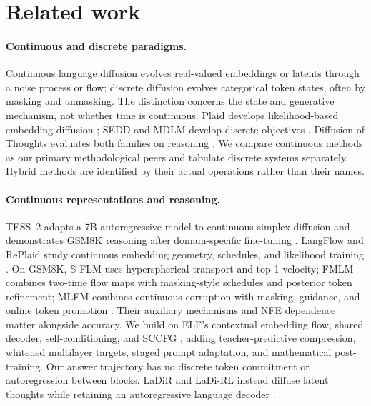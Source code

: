 \section{Related work}
\paragraph{Continuous and discrete paradigms.}
Continuous language diffusion evolves real-valued embeddings or latents through a noise process or flow; discrete diffusion evolves categorical token states, often by masking and unmasking. The distinction concerns the state and generative mechanism, not whether time is continuous. Plaid develops likelihood-based embedding diffusion \citep{plaid}; SEDD and MDLM develop discrete objectives \citep{sedd,mdlm}. Diffusion of Thoughts evaluates both families on reasoning \citep{dot}. We compare continuous methods as our primary methodological peers and tabulate discrete systems separately. Hybrid methods are identified by their actual operations rather than their names.

\paragraph{Continuous representations and reasoning.}
TESS~2 adapts a 7B autoregressive model to continuous simplex diffusion and demonstrates GSM8K reasoning after domain-specific fine-tuning \citep{tess2}. LangFlow and RePlaid study continuous embedding geometry, schedules, and likelihood training \citep{langflow,replaid}. On GSM8K, $\mathbb S$-FLM uses hyperspherical transport and top-1 velocity; FMLM+ combines two-time flow maps with masking-style schedules and posterior token refinement; MLFM combines continuous corruption with masking, guidance, and online token promotion \citep{hyperspherical,posterior,mlfm}. Their auxiliary mechanisms and NFE dependence matter alongside accuracy. We build on ELF's contextual embedding flow, shared decoder, self-conditioning, and SCCFG \citep{elf}, adding teacher-predictive compression, whitened multilayer targets, staged prompt adaptation, and mathematical post-training. Our answer trajectory has no discrete token commitment or autoregression between blocks. LaDiR and LaDi-RL instead diffuse latent thoughts while retaining an autoregressive language decoder \citep{ladir,ladirl}.

